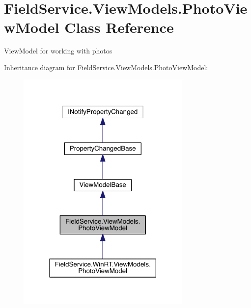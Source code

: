 \hypertarget{class_field_service_1_1_view_models_1_1_photo_view_model}{\section{Field\+Service.\+View\+Models.\+Photo\+View\+Model Class Reference}
\label{class_field_service_1_1_view_models_1_1_photo_view_model}
}


View\+Model for working with photos  




Inheritance diagram for Field\+Service.\+View\+Models.\+Photo\+View\+Model\+:
\nopagebreak
\begin{figure}[H]
\begin{center}
\leavevmode
\includegraphics[width=242pt]{class_field_service_1_1_view_models_1_1_photo_view_model__inherit__graph}
\end{center}
\end{figure}


